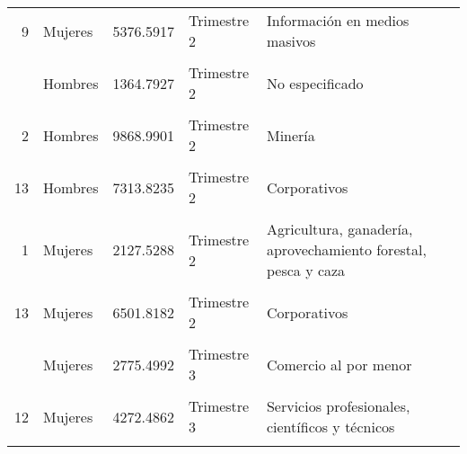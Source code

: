 \documentclass{article}
\begin{document}
\begin{table}[!h]
\begin{tabular}{rlrll}
9 & Mujeres & 5376.5917 & Trimestre 2 & Información en medios masivos\\
\cellcolor{gray!10}{3} & \cellcolor{gray!10}{Mujeres} & \cellcolor{gray!10}{6462.8268} & \cellcolor{gray!10}{Trimestre 2} & \cellcolor{gray!10}{Generación y distribución de electricidad, suministro de agua y gas}\\
\addlinespace
21 & Hombres & 1364.7927 & Trimestre 2 & No especificado\\
\cellcolor{gray!10}{8} & \cellcolor{gray!10}{Mujeres} & \cellcolor{gray!10}{4599.6941} & \cellcolor{gray!10}{Trimestre 2} & \cellcolor{gray!10}{Transportes, correos y almacenamiento}\\
2 & Hombres & 9868.9901 & Trimestre 2 & Minería\\
\cellcolor{gray!10}{17} & \cellcolor{gray!10}{Mujeres} & \cellcolor{gray!10}{3666.0936} & \cellcolor{gray!10}{Trimestre 2} & \cellcolor{gray!10}{Servicios de esparcimiento, culturales y deportivos}\\
13 & Hombres & 7313.8235 & Trimestre 2 & Corporativos\\
\addlinespace
\cellcolor{gray!10}{21} & \cellcolor{gray!10}{Mujeres} & \cellcolor{gray!10}{1316.4607} & \cellcolor{gray!10}{Trimestre 2} & \cellcolor{gray!10}{No especificado}\\
1 & Mujeres & 2127.5288 & Trimestre 2 & Agricultura, ganadería, aprovechamiento forestal, pesca y caza\\
\cellcolor{gray!10}{2} & \cellcolor{gray!10}{Mujeres} & \cellcolor{gray!10}{10479.9259} & \cellcolor{gray!10}{Trimestre 2} & \cellcolor{gray!10}{Minería}\\
13 & Mujeres & 6501.8182 & Trimestre 2 & Corporativos\\
\cellcolor{gray!10}{19} & \cellcolor{gray!10}{Hombres} & \cellcolor{gray!10}{4518.2922} & \cellcolor{gray!10}{Trimestre 3} & \cellcolor{gray!10}{Otros servicios, excepto actividades gubernamentales}\\
\addlinespace
7 & Mujeres & 2775.4992 & Trimestre 3 & Comercio al por menor\\
\cellcolor{gray!10}{12} & \cellcolor{gray!10}{Hombres} & \cellcolor{gray!10}{5792.5456} & \cellcolor{gray!10}{Trimestre 3} & \cellcolor{gray!10}{Servicios profesionales, científicos y técnicos}\\
12 & Mujeres & 4272.4862 & Trimestre 3 & Servicios profesionales, científicos y técnicos\\
\cellcolor{gray!10}{5} & \cellcolor{gray!10}{Mujeres} & \cellcolor{gray!10}{3607.0116} & \cellcolor{gray!10}{Trimestre 3} & \cellcolor{gray!10}{Industrias manufactureras}\\

\end{tabular}
\end{table}
\end{document}
